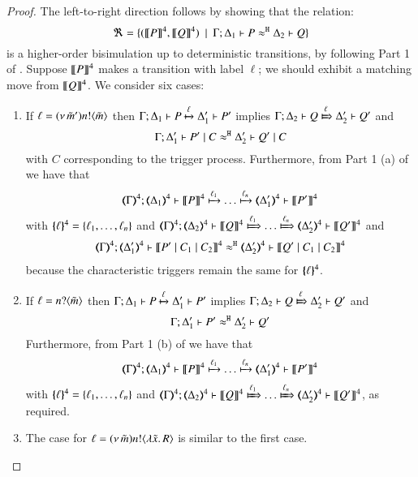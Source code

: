 \begin{proof}
			

\bigskip

\noi	The left-to-right direction follows by showing that the relation: %
%
	\[
		\Re = \{
		(\llbracket P\rrbracket^4, \llbracket Q\rrbracket^4)
		\ \ |\ \  \Gamma; \Delta_1 \vdash P \approx^\mathtt{H} \Delta_2 \vdash Q\}
	\]
is a higher-order bisimulation up to deterministic transitions, by following Part 1 of .
	Suppose $\llbracket P\rrbracket^4$ makes a transition with label $\ell$; we should exhibit a matching move from 
	$\llbracket Q\rrbracket^4$. 
	We consider six cases:
	\begin{enumerate}
		\item
		If $\ell = (\nu\, \tilde{m}') n ! \langle \tilde{m} \rangle$ then
		$
		\Gamma; \Delta_1 \vdash P \xmapsto{\ell} \Delta_1' \vdash P'
		$
		implies
	$
		\horel{\Gamma}{\Delta_2}{Q}{\Hby{\ell}}{\Delta_2'}{Q'}
		$
		and
		\[
		\Gamma; \Delta_1' \vdash P' \;|\; C \approx^\mathtt{H} \Delta_2' \vdash Q' \;|\; C
		\]
		with $C$ corresponding to the trigger process.
		Furthermore, from Part 1 (a) of  we have that
		$$\horel{\tmap{\Gamma}{4}}{\tmap{\Delta_1}{4}}{\pmap{P}{4}}{\hby{\ell_1} \dots \hby{\ell_n}}{\tmap{\Delta_1'}{4}}{\pmap{P'}{4}}$$
		with $\{\!\!\{\ell\}\!\!\}^{4} = \{\ell_1, \dots, \ell_n\}$
		and
		$\horel{\tmap{\Gamma}{4}}{\tmap{\Delta_2}{4}}{\pmap{Q}{4}}{\Hby{\ell_1} \dots \Hby{\ell_n}}{\tmap{\Delta_2'}{4}}{\pmap{Q'}{4}}$
		and
		\begin{eqnarray*}
			\horel{\tmap{\Gamma}{4}}{\tmap{\Delta_1'}{4}}{\pmap{P' \Par C_1 \Par C_2}{4}}{\hwb}{\tmap{\Delta_2'}{4}}{\pmap{Q' \Par C_1 \Par C_2}{4}}
		\end{eqnarray*}
		because the characteristic triggers remain the same for $\{\!\!\{\ell\}\!\!\}^{4}$.
						
		\item	If $\ell = n ? \langle \tilde{m} \rangle$ then
				$
				\Gamma; \Delta_1 \vdash P \xmapsto{\ell} \Delta_1' \vdash P'
				$
				implies
				$
				\horel{\Gamma}{\Delta_2}{Q}{\Hby{\ell}}{\Delta_2'}{Q'}
				$
				and
				\[
				\Gamma; \Delta_1' \vdash P' \approx^\mathtt{H} \Delta_2' \vdash Q'
				\]
				Furthermore, from Part 1 (b) of  we have that
				$$\horel{\tmap{\Gamma}{4}}{\tmap{\Delta_1}{4}}{\pmap{P}{4}}{\hby{\ell_1} \dots \hby{\ell_n}}{\tmap{\Delta_1'}{4}}{\pmap{P'}{4}}$$
				with $\{\!\!\{\ell\}\!\!\}^{4} = \{\ell_1, \dots, \ell_n\}$
				and
				$\horel{\tmap{\Gamma}{4}}{\tmap{\Delta_2}{4}}{\pmap{Q}{4}}{\Hby{\ell_1} \dots \Hby{\ell_n}}{\tmap{\Delta_2'}{4}}{\pmap{Q'}{4}}$,
				as required.
		\item	The case for $\ell = (\nu\, \tilde{m}) n ! \langle \lambda \tilde{x}.\,R \rangle$
		is similar to the first case.
		

\end{enumerate}
\end{proof}
